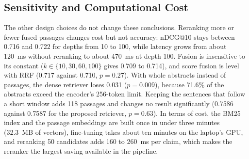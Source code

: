\subsection{Sensitivity and Computational Cost}
\label{sec:res-sensitivity}

The other design choices do not change these conclusions. Reranking more or fewer fused passages
changes cost but not accuracy: nDCG@10 stays between 0.716 and 0.722 for depths from 10 to 100,
while latency grows from about 120~ms without reranking to about 470~ms at depth 100. Fusion is
insensitive to its constant ($k \in \{10, 30, 60, 100\}$ gives 0.709 to 0.714), and score fusion
is level with RRF (0.717 against 0.710, $p = 0.27$). With whole abstracts instead of passages,
the dense retriever loses 0.031 ($p = 0.009$), because 71.6\% of the abstracts exceed the
encoder's 256-token limit. Keeping the sentences that follow a short window adds 118 passages and
changes no result significantly (0.7586 against 0.7587 for the proposed retriever, $p = 0.63$).
In terms of cost, the BM25 index and the passage embeddings are built once in under three minutes
(32.3~MB of vectors), fine-tuning takes about ten minutes on the laptop's GPU, and reranking 50
candidates adds 160 to 260~ms per claim, which makes the reranker the largest saving available
in the pipeline.
